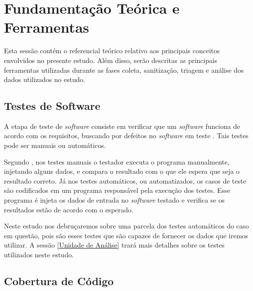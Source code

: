 \documentclass[11.5pt]{article}
\begin{document}


\section{Fundamentação Teórica e Ferramentas}

Esta sessão contém o referencial teórico relativo aos principais conceitos envolvidos no presente
estudo.
Além disso, serão descritas as principais ferramentas utilizadas durante as fases coleta,
sanitização, triagem e análise dos dados utilizados no estudo.


\subsection{Testes de Software}

A etapa de teste de \textit{software} consiste em verificar que um \textit{software} funciona de
acordo com os requisitos, buscando por defeitos no \textit{software} em teste
\cite{engSwSommerville}.
Tais testes pode ser manuais ou automáticos.

Segundo \cite{engSwSommerville}, nos testes manuais o testador executa o programa manualmente,
injetando alguns dados, e compara o resultado com o que ele espera que seja o resultado correto.
Já nos testes automáticos, ou automatizados, os casos de teste são codificados em um programa
responsável pela execução dos testes.
Esse programa é injeta os dados de entrada no \textit{software} testado e verifica se os resultados
estão de acordo com o esperado.

Neste estudo nos debruçaremos sobre uma parcela dos testes automáticos do caso em questão, pois são
esses testes que são capazes de fornecer os dados que iremos utilizar. A sessão
\ref{Unidade de Análise} trará mais detalhes sobre os testes utilizados neste estudo.



\subsection{Cobertura de Código}
\end{document}

